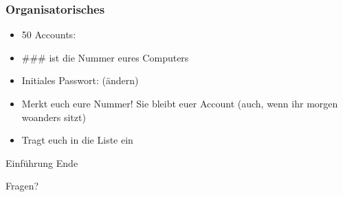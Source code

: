 \begin{frame}
	\frametitle{Organisatorisches}
	\begin{itemize}
		\item 50 Accounts: \texttt{}
		      \pause\item \#\#\# ist die Nummer eures Computers
		      \pause\item Initiales Passwort: \texttt{} (ändern)
		      \pause\item Merkt euch eure Nummer! Sie bleibt euer Account (auch, wenn
		      ihr morgen woanders sitzt)
		      \pause\item Tragt euch in die Liste ein
	\end{itemize}
\end{frame}

\begin{frame}
	\begin{center}
		\Huge Einführung Ende
	\end{center}
	\begin{center}
		\pause\Huge Fragen?
	\end{center}
\end{frame}


